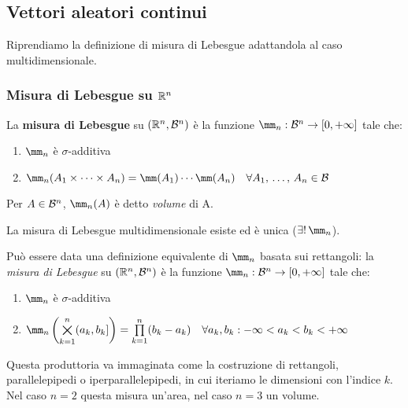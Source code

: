 \subsection{Vettori aleatori continui}
Riprendiamo la definizione di misura di Lebesgue adattandola al caso multidimensionale.

\subsubsection{Misura di Lebesgue su $\mathbb R^n$}
\begin{defn}
  La \textbf{misura di Lebesgue} su $(\mathbb R^n, \mathcal B^n)$
  è la funzione $\mm_n : \Bc^n \to [0, +\infty]$ tale che:
  \begin{enumerate}
    \item $\mm_n$ è $\sigma$-additiva
    \item $\mm_n(A_1 \times \dots \times A_n)
      = \mm(A_1) \cdots \mm(A_n)
      \quad \forall A_1, \, \dots, \, A_n \in \Bc$
  \end{enumerate}

  Per $A \in \mathcal B^n$, $\mm_n(A)$ è detto \textit{volume} di A.
\end{defn}

\begin{prop}
  La misura di Lebesgue multidimensionale esiste ed è unica ($\exists! \, \mm_n$).
\end{prop}

Può essere data una definizione equivalente di $\mm_n$ basata sui rettangoli:
la \textit{misura di Lebesgue} su $(\mathbb R^n, \mathcal B^n)$
è la funzione $\mm_n : \Bc^n \to [0, +\infty]$ tale che:
\begin{enumerate}
  \item $\mm_n$ è $\sigma$-additiva
  \item $\mm_n \left(\bigtimes\limits_{k=1}^n (a_k, b_k]\right)
    = \prod\limits_{k=1}^n (b_k - a_k)
    \quad \forall a_k, b_k: -\infty < a_k < b_k < +\infty$
\end{enumerate}
Questa produttoria va immaginata come la costruzione di rettangoli, parallelepipedi o iperparallelepipedi, in cui iteriamo le dimensioni con l'indice $k$. Nel caso $n=2$ questa misura un'area, nel caso $n=3$ un volume.

